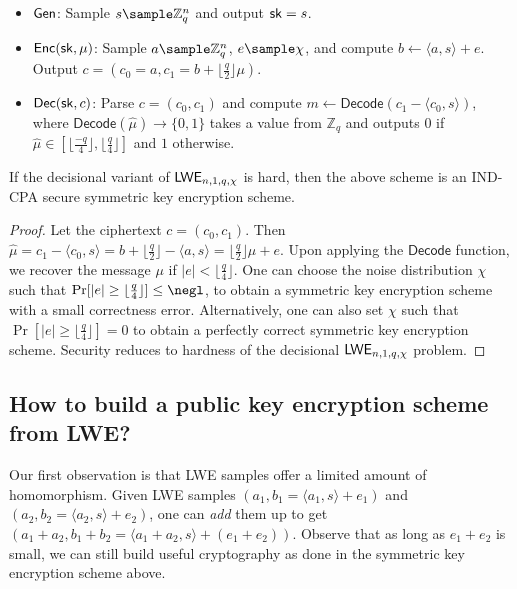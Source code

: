 \begin{itemize}
    \item $\mathsf{Gen}$: Sample $s \sample \mathbb{Z}_q^n$ and output $\mathsf{sk} = s$.
    \item $\mathsf{Enc}(\mathsf{sk},\mu)$: Sample $a \sample \mathbb{Z}_q^n$, $e \sample \chi$, and compute $b \gets \langle a, s \rangle + e$. Output $c = (c_0 = a, c_1 = b + \lfloor\frac{q}{2}\rfloor\mu)$.
    \item $\mathsf{Dec}(\mathsf{sk},c)$: Parse $c = (c_0, c_1)$ and compute $m \gets \mathsf{Decode}(c_1 - \langle c_0, s \rangle)$, where $\mathsf{Decode}(\hat{\mu}) \to \{0,1\}$ takes a value from $\mathbb{Z}_q$ and outputs $0$ if $\hat{\mu} \in [\lfloor\frac{-q}{4}\rfloor, \lfloor\frac{q}{4}\rfloor]$ and $1$ otherwise.
\end{itemize}

\begin{theorem}
    If the decisional variant of $\mathsf{LWE}_{n,1,q,\chi}$ is hard, then the above scheme is an IND-CPA secure symmetric key encryption scheme.
\end{theorem}
\begin{proof}
    Let the ciphertext $c = (c_0, c_1)$. Then $\hat{\mu} = c_1 - \langle c_0,s\rangle = b + \lfloor\frac{q}{2}\rfloor - \langle a,s\rangle = \lfloor\frac{q}{2}\rfloor\mu + e$. Upon applying the $\mathsf{Decode}$ function, we recover the message $\mu$ if $|e| < \lfloor\frac{q}{4}\rfloor$.
    One can choose the noise distribution $\chi$ such that
    $\Pr[|e| \geq \lfloor\frac{q}{4}\rfloor] \leq \negl$, to obtain a symmetric key encryption scheme with a small correctness error. Alternatively, one can also set $\chi$ such that $\Pr[|e| \geq \lfloor\frac{q}{4}\rfloor] = 0$ to obtain a perfectly correct symmetric key encryption scheme.
    Security reduces to hardness of the decisional $\mathsf{LWE}_{n,1,q,\chi}$ problem.
\end{proof}

\subsection{How to build a public key encryption scheme from LWE?}
Our first observation is that LWE samples offer a limited amount of homomorphism. Given LWE samples $(a_1, b_1 = \langle a_1, s\rangle + e_1)$ and $(a_2, b_2 = \langle a_2, s\rangle + e_2)$, one can \emph{add} them up to get $(a_1 + a_2, b_1 + b_2 = \langle a_1 + a_2, s\rangle + (e_1+e_2))$. Observe that as long as $e_1 + e_2$ is small, we can still build useful cryptography as done in the symmetric key encryption scheme above.

